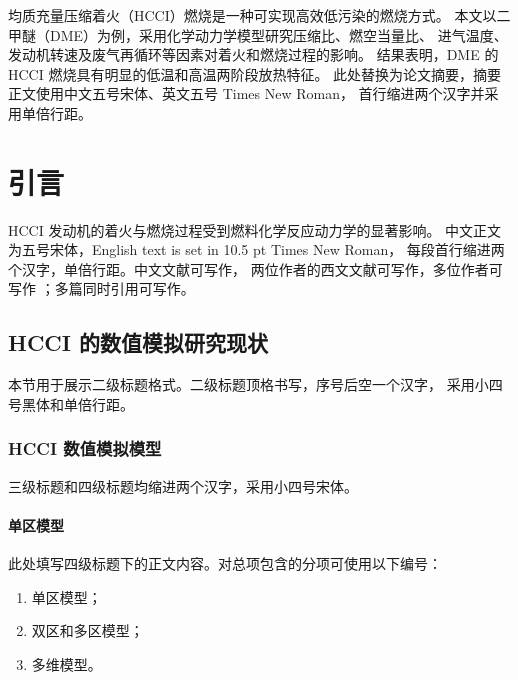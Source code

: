 \documentclass{techpaper2026}
\begin{document}
\makepapertitle

\begin{paperabstract}
均质充量压缩着火（HCCI）燃烧是一种可实现高效低污染的燃烧方式。
本文以二甲醚（DME）为例，采用化学动力学模型研究压缩比、燃空当量比、
进气温度、发动机转速及废气再循环等因素对着火和燃烧过程的影响。
结果表明，DME 的 HCCI 燃烧具有明显的低温和高温两阶段放热特征。
此处替换为论文摘要，摘要正文使用中文五号宋体、英文五号 Times New Roman，
首行缩进两个汉字并采用单倍行距。
\end{paperabstract}


\section{引言}

HCCI 发动机的着火与燃烧过程受到燃料化学反应动力学的显著影响。
中文正文为五号宋体，English text is set in 10.5 pt Times New Roman，
每段首行缩进两个汉字，单倍行距。中文文献可写作\citep{li1959}，
两位作者的西文文献可写作\citep{hanahan2000}，多位作者可写作
\citep{you1980}；多篇同时引用可写作\citep{hanahan2000,you1980}。

\subsection{HCCI 的数值模拟研究现状}

本节用于展示二级标题格式。二级标题顶格书写，序号后空一个汉字，
采用小四号黑体和单倍行距。

\subsubsection{HCCI 数值模拟模型}

三级标题和四级标题均缩进两个汉字，采用小四号宋体。

\paragraph{单区模型}

此处填写四级标题下的正文内容。对总项包含的分项可使用以下编号：

\begin{enumerate}
  \item 单区模型；
  \item 双区和多区模型；
  \item 多维模型。
\end{enumerate}
\end{document}
